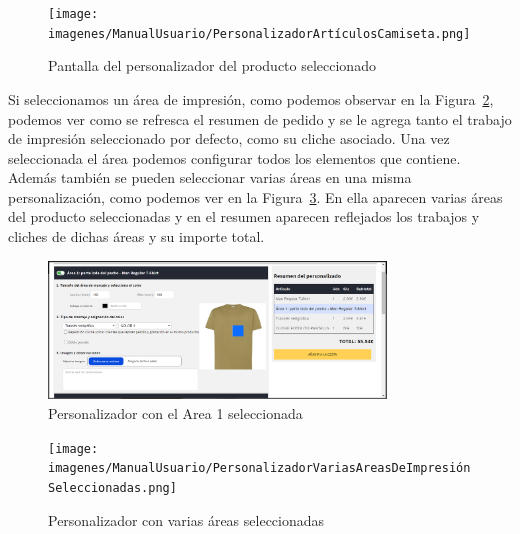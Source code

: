 \documentclass[12pt]{article}
\begin{document}
\begin{figure}[ht]
    \centering
    \texttt{[image: imagenes/ManualUsuario/PersonalizadorArtículosCamiseta.png]}
    \caption{\label{fig:Personalizador}Pantalla del personalizador del producto seleccionado}
    \vspace{\fill}
\end{figure}

Si seleccionamos un área de impresión, como podemos observar en la Figura~\ref{fig:PersonalizadorAreaMarcada}, podemos ver como se refresca el resumen de pedido y se le agrega tanto el trabajo de impresión
seleccionado por defecto, como su cliche asociado. Una vez seleccionada el área podemos configurar todos los elementos que contiene. Además también se pueden seleccionar varias áreas en una misma personalización, como 
podemos ver en la Figura~\ref{fig:PersonalizadorVariasAreas}. En ella aparecen varias áreas del producto seleccionadas y en el resumen aparecen reflejados los trabajos y cliches de dichas áreas y su importe total.

\begin{figure}[ht]
    \centering
    \includegraphics[width=0.8\textwidth]{imagenes/ManualUsuario/PersonalizadorArea1Seleccionada.png}
    \caption{\label{fig:PersonalizadorAreaMarcada}Personalizador con el Area 1 seleccionada}
    \vspace{\fill}
\end{figure}

\begin{figure}[ht]
    \centering
    \texttt{[image: imagenes/ManualUsuario/PersonalizadorVariasAreasDeImpresiónSeleccionadas.png]}
    \caption{\label{fig:PersonalizadorVariasAreas}Personalizador con varias áreas seleccionadas}
    \vspace{\fill}
\end{figure}
\end{document}
